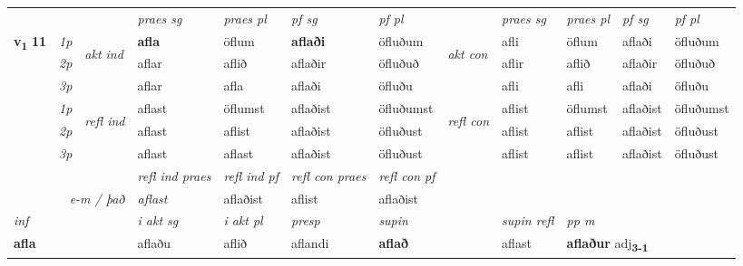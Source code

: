 \begin{longtable}[l]{X>{\footnotesize\itshape}llXXXXlXXXX}
\midrule

 & &   & \textit{praes sg}  & \textit{praes pl}    & \textit{ pf sg} & \textit{pf pl} & & \textit{praes sg}  & \textit{praes pl}    & \textit{pf sg} & \textit{pf pl }  \\ \cmidrule{4-7} \cmidrule{9-12}
 \multirow{2}{*}{{{\textbf{v{\textsubscript{1}}} \Large{\textbf{11}}}}}  & 1p & \multirow{3}{*}{\begin{turn}{90}\textit{akt ind}\end{turn}} & \textbf{afla} & öflum & \textbf{aflaði} & öfluðum & \multirow{3}{*}{\begin{turn}{90}\textit{akt con}\end{turn}} &afli & öflum & aflaði & öfluðum\\*
 & 2p &  &  aflar  & aflið & aflaðir & öfluðuð & & aflir & aflið & aflaðir & öfluðuð \\*
 & 3p &  & aflar & afla & aflaði & öfluðu & & afli & afli& aflaði & öfluðu \\*
\cmidrule{4-7} \cmidrule{9-12}
 & 1p & \multirow{3}{*}{\begin{turn}{90}\textit{refl ind}\end{turn}}  & aflast & öflumst & aflaðist & öfluðumst & \multirow{3}{*}{\begin{turn}{90}\textit{refl con}\end{turn}}  &aflist & öflumst & aflaðist & öfluðumst \\*
 & 2p &  & aflast & aflist & aflaðist & öfluðust & &aflist & aflist & aflaðist & öfluðust \\*
 & 3p  & & aflast & aflast & aflaðist & öfluðust & & aflist & aflist& aflaðist & öfluðust \\*
\cmidrule{4-7} \cmidrule{9-12}

 & && \textit{refl ind praes} & \textit{refl ind pf} & \textit{refl con praes} & \textit{refl con pf} \\*
\multicolumn{3}{r}{\textit{e-m / það}}& aflast & aflaðist & aflist & aflaðist \\*

\cmidrule{4-7}
   {\textit{inf}} & &  & \textit{i akt sg} & \textit{i akt pl}   & \textit{presp} & \textit{supin} && \textit{supin refl} & \textit{pp m} \\*
  {\textbf{afla}} & && aflaðu  & aflið   & aflandi &  \textbf{aflað} && aflast & \multicolumn{2}{l}{\textbf{aflaður} adj\textbf{\textsubscript{3-1}}} \\*

\midrule


\end{longtable}
